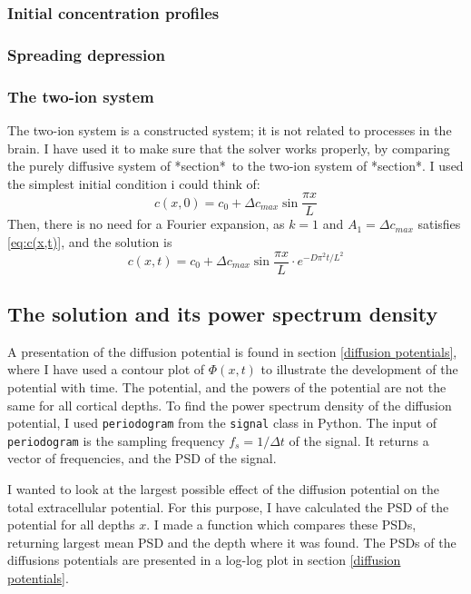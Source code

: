 \documentclass{article}
\begin{document}
\subsubsection{Initial concentration profiles}

\subsubsection{Spreading depression}

\subsubsection{The two-ion system}
The two-ion system is a constructed system; it is not related to processes in the brain. I have used it to make sure that the solver works properly, by comparing the purely diffusive system of *section*\ to the two-ion system of *section*. I used the simplest initial condition i could think of: 
$$c(x,0) =c_0 +  \Delta c_{max}\sin{\frac{\pi x}{L}}$$
Then, there is no need for a Fourier expansion, as $k=1$ and $A_1 = \Delta c_{max}$ satisfies \ref{eq:c(x,t)}, and the solution is
\begin{equation*}
c(x,t) =c_0 + \Delta c_{max} \sin \frac{ \pi x}{L}\cdot e^{-D\pi^2 t /L^2}
\end{equation*}


\subsection{The solution and its power spectrum density}
A presentation of the diffusion potential is found in section \ref{diffusion potentials}, where I have used a contour plot of $\Phi(x,t)$ to illustrate the development of the potential with time. The potential, and the powers of the potential are not the same for all cortical depths.
To find the power spectrum density of the diffusion potential, I used \texttt{periodogram}  from the \texttt{signal} class in Python. The input of \texttt{periodogram} is the sampling frequency $f_s = 1/\Delta t$ of the signal. It returns a vector of frequencies, and the PSD of the signal.

 I wanted to look at the largest possible effect of the diffusion potential on the total extracellular potential. For this purpose, I have calculated the PSD of the potential for all depths $x$. I made a function which compares these PSDs, returning largest mean PSD and the depth where it was found. The PSDs of the diffusions potentials are presented in a log-log plot in section \ref{diffusion potentials}.
\end{document}
